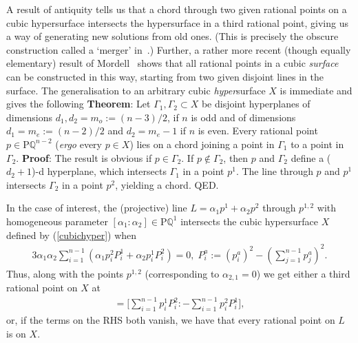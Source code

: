 \documentclass[prl,reprint,amsmath,amssymb,notitlepage]{revtex4-1}
\begin{document}
A result of antiquity tells us that a chord
through two given
rational points on a cubic hypersurface intersects the hypersurface in
a third rational point, giving us a way of generating new solutions from
old ones. (This is precisely the obscure construction called a `merger' in~\cite{Costa_Dobrescu_Fox_2019}.)
Further, a rather more recent (though
equally elementary) result of
Mordell~\cite{Mordell_1969} shows that all rational points in a
cubic {\em surface} can be
constructed in this way, starting from two
given disjoint lines in the surface. The generalisation to an arbitrary cubic
{\em hyper}surface $X$ is immediate and gives the following
\newline
{\bf Theorem}: Let $\Gamma_1, \Gamma_2\subset X$ be disjoint
hyperplanes of dimensions
$d_1,d_2=m_o:= (n-3)/2$, if $n$ is odd and of dimensions
$d_1=m_e := (n-2)/2$ and $d_2=m_e-1$ if $n$ is even. Every rational
point $p\in \mathrm{P}\mathbb{Q}^{n-2}$ ({\em ergo} every $p \in X$) lies on a chord joining a point
in $\Gamma_1$ to a point in $\Gamma_2$. 
\newline
{\bf Proof}: The result is obvious if $p \in \Gamma_2$. If $p\notin
\Gamma_2$, then $p$ and $\Gamma_2$ define a ($d_2+1$)-d hyperplane,
which intersects $\Gamma_1$ in a point $p^1$. The line through $p$ and
$p^1$ intersects $\Gamma_2$ in a point $p^2$, yielding a chord. QED.

In the case of interest,
the (projective) line $L=\alpha_1 p^1+\alpha_2 p^2$ through $p^{1,2}$ with homogeneous parameter
$[\alpha_1:\alpha_2] \in \mathrm{P}\mathbb{Q}^1$ 
intersects the cubic hypersurface $X$ defined by (\ref{cubichyper}) when
\begin{align} \label{lineincube}
3\alpha_1 \alpha_2\sum_{i=1}^{n-1}\left(\alpha_1 p^2_i P^1_i+\alpha_2 p^1_i P^2_i\right)=0,\;
 P^a_i:= (p^a_i)^2-\left(\sum_{j=1}^{n-1} p^a_j\right)^2. \nonumber
\end{align}
Thus, along with the points $p^{1,2}$ (corresponding to
$\alpha_{2,1}=0$) we get either a third rational point on $X$ at
\begin{align}
[\alpha_1:\alpha_2]=\Bigg[\sum_{i=1}^{n-1}p^1_i P^2_i:-\sum_{i=1}^{n-1}p^2_iP^1_i\Bigg], \nonumber
\end{align}
or, if the terms on the RHS both vanish, we have that every rational point on
$L$ is on $X$. 
\end{document}
